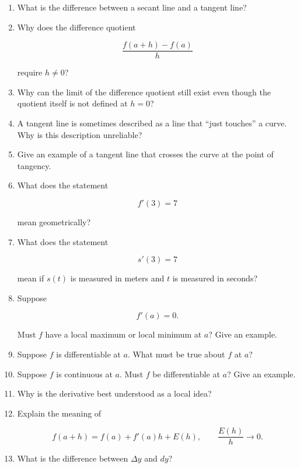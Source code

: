 \begin{enumerate}
\item What is the difference between a secant line and a tangent line?

\item Why does the difference quotient

\[
\frac{f(a+h)-f(a)}{h}
\]

require \(h\neq0\)?

\item Why can the limit of the difference quotient still exist even though the quotient itself is not defined at \(h=0\)?

\item A tangent line is sometimes described as a line that ``just touches'' a curve.  Why is this description unreliable?

\item Give an example of a tangent line that crosses the curve at the point of tangency.

\item What does the statement

\[
f'(3)=7
\]

mean geometrically?

\item What does the statement

\[
s'(3)=7
\]

mean if \(s(t)\) is measured in meters and \(t\) is measured in seconds?

\item Suppose

\[
f'(a)=0.
\]

Must \(f\) have a local maximum or local minimum at \(a\)?  Give an example.

\item Suppose \(f\) is differentiable at \(a\).  What must be true about \(f\) at \(a\)?

\item Suppose \(f\) is continuous at \(a\).  Must \(f\) be differentiable at \(a\)?  Give an example.

\item Why is the derivative best understood as a local idea?

\item Explain the meaning of

\[
f(a+h)=f(a)+f'(a)h+E(h),
\qquad
\frac{E(h)}{h}\to0.
\]

\item What is the difference between \(\Delta y\) and \(dy\)?


\end{enumerate}
